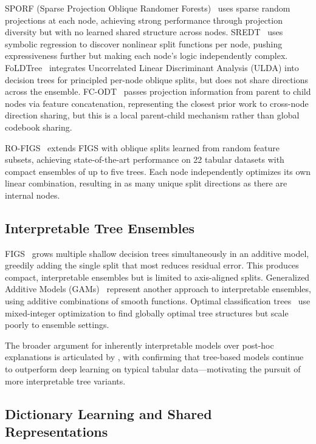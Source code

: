 \documentclass[11pt,letterpaper]{article}
\begin{document}
SPORF (Sparse Projection Oblique Randomer Forests)~\citep{Tomita2020} uses sparse random projections at each node, achieving strong performance through projection diversity but with no learned shared structure across nodes. SREDT~\citep{Fong2024} uses symbolic regression to discover nonlinear split functions per node, pushing expressiveness further but making each node's logic independently complex. FoLDTree~\citep{Wang2024} integrates Uncorrelated Linear Discriminant Analysis (ULDA) into decision trees for principled per-node oblique splits, but does not share directions across the ensemble. FC-ODT~\citep{Lyu2025} passes projection information from parent to child nodes via feature concatenation, representing the closest prior work to cross-node direction sharing, but this is a local parent-child mechanism rather than global codebook sharing.

RO-FIGS~\citep{Mattikalli2025} extends FIGS with oblique splits learned from random feature subsets, achieving state-of-the-art performance on 22 tabular datasets with compact ensembles of up to five trees. Each node independently optimizes its own linear combination, resulting in as many unique split directions as there are internal nodes.

\subsection{Interpretable Tree Ensembles}

FIGS~\citep{Tan2022} grows multiple shallow decision trees simultaneously in an additive model, greedily adding the single split that most reduces residual error. This produces compact, interpretable ensembles but is limited to axis-aligned splits. Generalized Additive Models (GAMs)~\citep{Lou2012} represent another approach to interpretable ensembles, using additive combinations of smooth functions. Optimal classification trees~\citep{Bertsimas2017} use mixed-integer optimization to find globally optimal tree structures but scale poorly to ensemble settings.

The broader argument for inherently interpretable models over post-hoc explanations is articulated by \citet{Rudin2019}, with \citet{Grinsztajn2022} confirming that tree-based models continue to outperform deep learning on typical tabular data---motivating the pursuit of more interpretable tree variants.

\subsection{Dictionary Learning and Shared Representations}
\end{document}
